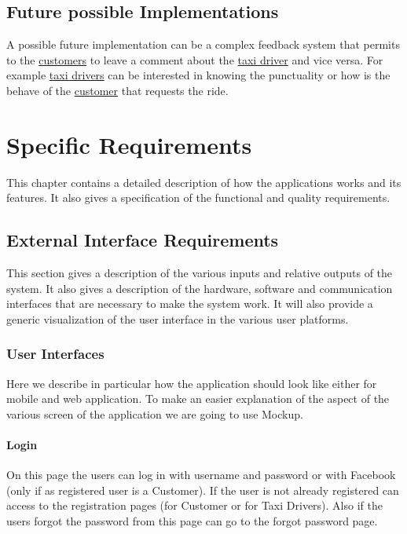 \documentclass{report}
\begin{document}
	\section{Future possible Implementations}
	A possible future implementation can be a complex feedback system that permits to the \hyperref[sec:customer]{customers} to leave a comment about the \hyperref[sec:tdriver]{taxi driver} and vice versa.
	For example \hyperref[sec:tdriver]{taxi drivers} can be interested in knowing the punctuality or how is the behave of the \hyperref[sec:customer]{customer} that requests the ride.

\chapter{Specific Requirements}
This chapter contains a detailed description of how the applications works and its features. It also gives a specification of the functional and quality requirements.

	\section{External Interface Requirements}
	This section gives a description of the various inputs and relative outputs of the system. It also gives a description of the hardware, software and communication interfaces that are necessary to make the system work. It will also provide a generic visualization of the user interface in the various user platforms.

		\subsection{User Interfaces}
		Here we describe in particular how the application should look like either for mobile and web application. To make an easier explanation of the aspect of the various screen of the application we are going to use Mockup.
			\subsubsection{Login}
			On this page the users can log in with username and password or with Facebook (only if as registered user is a Customer). If the user is not already registered can access to the registration pages (for Customer or for Taxi Drivers). Also if the users forgot the password from this page can go to the forgot password page.
				
\end{document}
